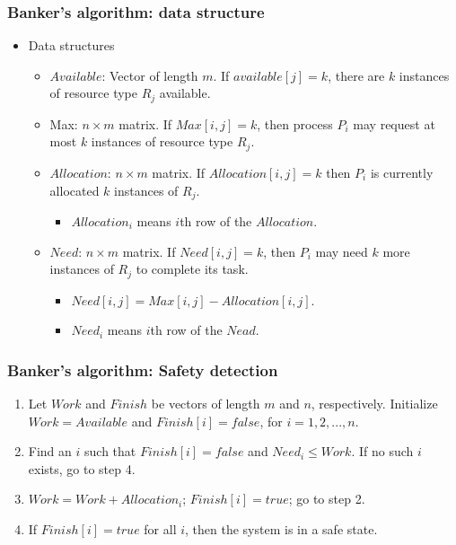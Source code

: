 \documentclass[CJKutf8,dvipsnames,table]{beamer}
\begin{document}
\begin{CJK*}{UTF8}{song}
\begin{frame}
\begin{itemize}
  \end{itemize}
  \end{frame}

  \begin{frame}
  \frametitle{Banker's algorithm: data structure} \pause
  \begin{itemize}
  \item{Data structures} \pause
    \begin{itemize}
    \item{$Available$:  Vector of length $m$. If $available[j] = k$, there are $k$ instances of resource type $R_j$ available.} \pause
    \item{Max: $n \times m$ matrix.  If $Max[i,j] = k$, then process $P_i$ may request at most $k$ instances of resource type $R_j$.} \pause
    \item{$Allocation$:  $n \times m$ matrix.  If $Allocation[i,j] = k$ then $P_i$ is currently allocated $k$ instances of $R_j$.} \pause
      \begin{itemize}
      \item{$Allocation_i$ means $i$th row of the $Allocation$.} \pause
      \end{itemize}
    \item{$Need$:  $n \times m$ matrix. If $Need[i,j] = k$, then $P_i$ may need $k$ more instances of $R_j$ to complete its task.} \pause
      \begin{itemize}
      \item{$Need[i,j] = Max[i,j] - Allocation [i,j]$.} \pause
      \item{$Need_i$ means $i$th row of the $Nead$.}
      \end{itemize}
    \end{itemize}
  \end{itemize}
  \end{frame}

  \begin{frame}
  \frametitle{Banker's algorithm: Safety detection} \pause
  \begin{enumerate}
  \item{Let $Work$ and $Finish$ be vectors of length $m$ and $n$, respectively. Initialize $Work = Available$ and $Finish[i] = false$, for $i=1, 2, ..., n$.} \pause
  \item{Find an $i$ such that \pause
      \newline
      $Finish[i] = false$ and $Need_i \leq Work$. \pause
      \newline
      If no such $i$ exists, go to step 4. \pause
    }
  \item{$Work = Work + Allocation_i$; $Finish[i] = true$; \newline go to step 2.} \pause
  \item{If $Finish[i] = true$ for all $i$, then the system is in a safe state.} \pause
  \end{enumerate}
  \end{frame}


\end{CJK*}
\end{document}
